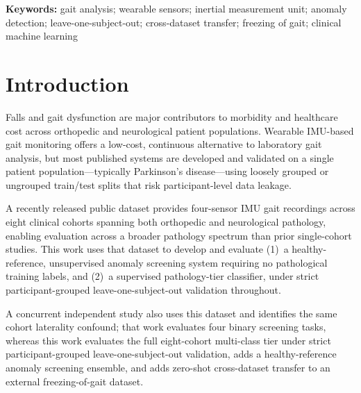 \documentclass[11pt,a4paper]{article}
\begin{document}
\noindent\textbf{Keywords:} gait analysis; wearable sensors; inertial measurement unit; anomaly detection; leave-one-subject-out; cross-dataset transfer; freezing of gait; clinical machine learning

\section{Introduction}

Falls and gait dysfunction are major contributors to morbidity and healthcare cost across orthopedic and neurological patient populations. Wearable IMU-based gait monitoring offers a low-cost, continuous alternative to laboratory gait analysis, but most published systems are developed and validated on a single patient population---typically Parkinson's disease---using loosely grouped or ungrouped train/test splits that risk participant-level data leakage.

A recently released public dataset \citep{voisard2025,voisard2025figshare} provides four-sensor IMU gait recordings across eight clinical cohorts spanning both orthopedic and neurological pathology, enabling evaluation across a broader pathology spectrum than prior single-cohort studies. This work uses that dataset to develop and evaluate (1)~a healthy-reference, unsupervised anomaly screening system requiring no pathological training labels, and (2)~a supervised pathology-tier classifier, under strict participant-grouped leave-one-subject-out validation throughout.

A concurrent independent study \citep{sadeghsalehi2025} also uses this dataset and identifies the same cohort laterality confound; that work evaluates four binary screening tasks, whereas this work evaluates the full eight-cohort multi-class tier under strict participant-grouped leave-one-subject-out validation, adds a healthy-reference anomaly screening ensemble, and adds zero-shot cross-dataset transfer to an external freezing-of-gait dataset.
\end{document}
